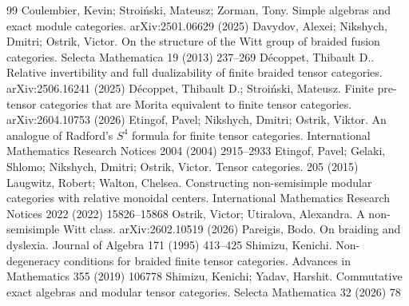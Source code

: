 \documentclass[10pt,a4paper]{amsart}
\numberwithin{equation}{section}
\begin{document}
\begin{thebibliography}{99}
 Coulembier, Kevin; Stroi{\'n}ski, Mateusz; Zorman, Tony. Simple algebras and exact module categories. arXiv:2501.06629 (2025)
 Davydov, Alexei; Nikshych, Dmitri; Ostrik, Victor. On the structure of the Witt group of braided fusion categories. Selecta Mathematica 19 (2013) 237--269
 D{\'e}coppet, Thibault D.. Relative invertibility and full dualizability of finite braided tensor categories. arXiv:2506.16241 (2025)
 D{\'e}coppet, Thibault D.; Stroi{\'n}ski, Mateusz. Finite pre-tensor categories that are {M}orita equivalent to finite tensor categories. arXiv:2604.10753 (2026)
 Etingof, Pavel; Nikshych, Dmitri; Ostrik, Viktor. An analogue of {R}adford's ${S}^4$ formula for finite tensor categories. International Mathematics Research Notices 2004 (2004) 2915--2933
 Etingof, Pavel; Gelaki, Shlomo; Nikshych, Dmitri; Ostrik, Victor. Tensor categories. 205 (2015)
 Laugwitz, Robert; Walton, Chelsea. Constructing non-semisimple modular categories with relative monoidal centers. International Mathematics Research Notices 2022 (2022) 15826--15868
 Ostrik, Victor; Utiralova, Alexandra. A non-semisimple {W}itt class. arXiv:2602.10519 (2026)
 Pareigis, Bodo. On braiding and dyslexia. Journal of Algebra 171 (1995) 413--425
 Shimizu, Kenichi. Non-degeneracy conditions for braided finite tensor categories. Advances in Mathematics 355 (2019) 106778
 Shimizu, Kenichi; Yadav, Harshit. Commutative exact algebras and modular tensor categories. Selecta Mathematica 32 (2026) 78
\end{thebibliography}
\end{document}
